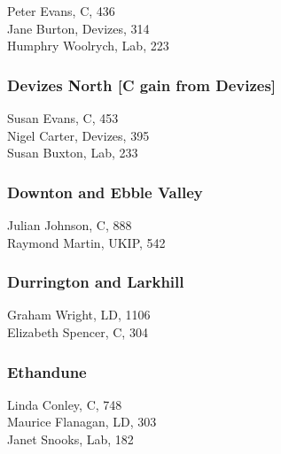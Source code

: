 \documentclass[a4paper,openany,10pt]{book}
\begin{document}


Peter Evans, C, 436\\
Jane Burton, Devizes, 314\\
Humphry Woolrych, Lab, 223\\


\subsubsection*{Devizes North \hspace*{\fill}\nolinebreak[1]%
\enspace\hspace*{\fill}
[C gain from Devizes]}



Susan Evans, C, 453\\
Nigel Carter, Devizes, 395\\
Susan Buxton, Lab, 233\\


\subsubsection*{Downton and Ebble Valley}



Julian Johnson, C, 888\\
Raymond Martin, UKIP, 542\\


\subsubsection*{Durrington and Larkhill}



Graham Wright, LD, 1106\\
Elizabeth Spencer, C, 304\\


\subsubsection*{Ethandune}



Linda Conley, C, 748\\
Maurice Flanagan, LD, 303\\
Janet Snooks, Lab, 182\\
\end{document}
